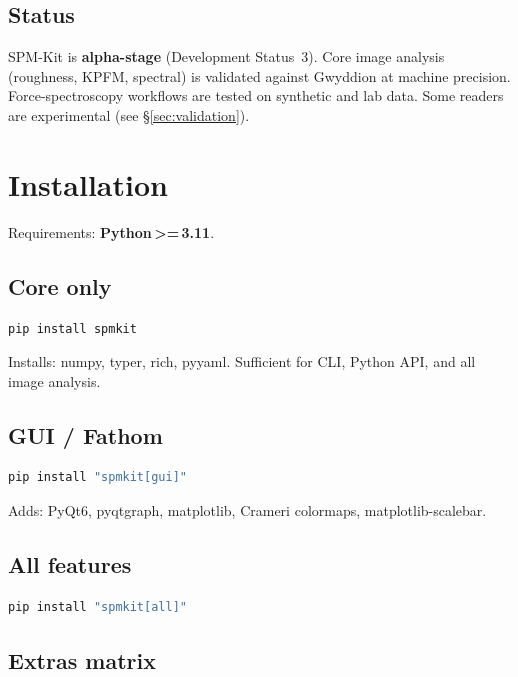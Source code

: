\documentclass[a4paper,11pt]{article}
\begin{document}
\subsection{Status}
SPM-Kit is \textbf{alpha-stage} (Development Status~3). Core image analysis
(roughness, KPFM, spectral) is validated against Gwyddion at machine precision.
Force-spectroscopy workflows are tested on synthetic and lab data. Some readers
are experimental (see \S\ref{sec:validation}).

\section{Installation}

Requirements: \textbf{Python\,{\textgreater}=\,3.11}.

\subsection{Core only}
\begin{lstlisting}[language=bash]
pip install spmkit
\end{lstlisting}

Installs: numpy, typer, rich, pyyaml. Sufficient for CLI, Python API, and all image analysis.

\subsection{GUI / Fathom}
\begin{lstlisting}[language=bash]
pip install "spmkit[gui]"
\end{lstlisting}

Adds: PyQt6, pyqtgraph, matplotlib, Crameri colormaps, matplotlib-scalebar.

\subsection{All features}
\begin{lstlisting}[language=bash]
pip install "spmkit[all]"
\end{lstlisting}

\subsection{Extras matrix}
\end{document}
